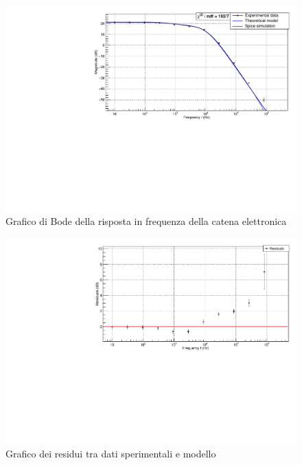 \documentclass{article}
\begin{document}
\begin{center}
\begin{figure}[H]
\centering
\includegraphics[scale=0.4, angle=0]{bodecatena.pdf}
\caption{Grafico di Bode della risposta in frequenza della catena elettronica}
\label{fig:catenaQvsV}
\end{figure}
\end{center}

\begin{center}
\begin{figure}[H]
\centering
\includegraphics[scale=0.4, angle=0]{bodecatenaresidui.pdf}
\caption{Grafico dei residui tra dati sperimentali e modello}
\label{fig:catenaQvsV_res}
\end{figure}
\end{center}
\end{document}
